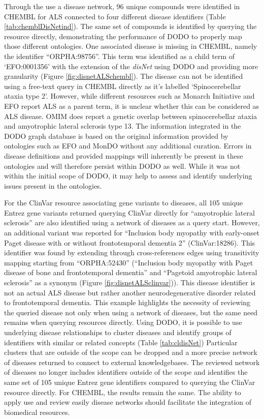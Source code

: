 \documentclass[9pt,a4paper,]{extarticle}
\begin{document}
Through the use a disease network, 96 unique compounds were identified in CHEMBL for ALS connected to four different disease identifiers (Table \ref{tab:chemblDisNetind}). The same set of compounds is identified by querying the resource directly, demonstrating the performance of DODO to properly map those different ontologies. One associated disease is missing in CHEMBL, namely the identifier ``ORPHA:98756''. This term was identified as a child term of `EFO:0001356' with the extension of the \emph{disNet} using DODO and providing more granularity (Figure \ref{fig:disnetALSchembl}). The disease can not be identified using a free-text query in CHEMBL directly as it's labelled `Spinocerebellar ataxia type 2'. However, while different resources such as Monarch Initiative and EFO report ALS as a parent term, it is unclear whether this can be considered as ALS disease. OMIM does report a genetic overlap between spinocerebellar ataxia and amyotrophic lateral sclerosis type 13. The information integrated in the DODO graph database is based on the original information provided by ontologies such as EFO and MonDO without any additional curation. Errors in disease definitions and provided mappings will inherently be present in these ontologies and will therefore persist within DODO as well. While it was not within the initial scope of DODO, it may help to assess and identify underlying issues present in the ontologies.

For the ClinVar resource associating gene variants to diseases, all 105 unique Entrez gene variants returned querying ClinVar directly for ``amyotrophic lateral sclerosis'' are also identified using a network of diseases as a query start. However, an additional variant was reported for ``Inclusion body myopathy with early-onset Paget disease with or without frontotemporal dementia 2'' (ClinVar:18286). This identifier was found by extending through cross-references edges using transitivity mapping starting from ``ORPHA:52430'' (``Inclusion body myopathy with Paget disease of bone and frontotemporal dementia'' and ``Pagetoid amyotrophic lateral sclerosis'' as a synonym (Figure \ref{fig:disnetALSclinvar})). This disease identifier is not an actual ALS disease but rather another neurodegenerative disorder related to frontotemporal dementia. This example highlights the necessity of reviewing the queried disease not only when using a network of diseases, but the same need remains when querying resources directly. Using DODO, it is possible to use underlying disease relationships to cluster diseases and identify groups of identifiers with similar or related concepts (Table \ref{tab:cldisNet}) Particular clusters that are outside of the scope can be dropped and a more precise network of diseases returned to connect to external knowledgebases. The reviewed network of diseases no longer includes identifiers outside of the scope and identifies the same set of 105 unique Entrez gene identifiers compared to querying the ClinVar resource directly. For CHEMBL, the results remain the same. The ability to apply use and review easily disease networks should facilitate the integration of biomedical resources.
\end{document}

